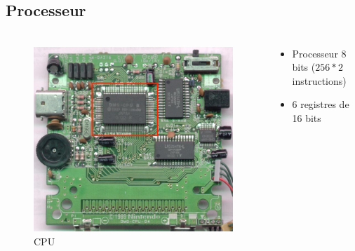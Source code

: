 \documentclass{beamer}
\begin{document}
\subsection{Processeur}
\begin{frame}
	\frametitle{\secname}
  \framesubtitle{\subsecname}
  \begin{columns}[T]
		\begin{column}{.30\textwidth}
			\begin{figure}
				\includegraphics[width=1\textwidth]{images/cpu.jpg}
				\caption{CPU}
			\end{figure}
		\end{column}
		\begin{column}{.70\textwidth}
      \begin{itemize}
        \item Processeur 8 bits ($256*2$ instructions)
        \item 6 registres de 16 bits
      \end{itemize}
      \begin{center}
\end{center}
\end{column}
\end{columns}
\end{frame}
\end{document}
